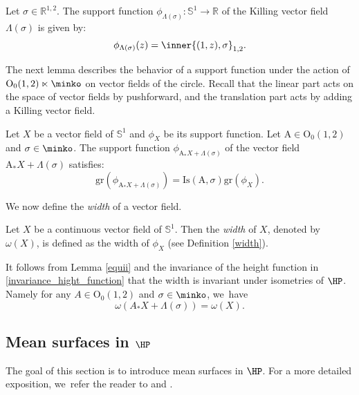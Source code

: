 \begin{cor}\label{support_function_of_killing}
Let $\sigma\in \mathbb{R}^{1,2}$. The support function $\phi_{\Lambda(\sigma)}:\mathbb{S}^1\to \mathbb{R}$ of the Killing vector field $\Lambda(\sigma)$ is given by:
\[
\phi_{\Lambda(\sigma)}(z)=\inner{(1,z),\sigma}_{1,2}.
\]
\end{cor}
The next lemma describes the behavior of a support function under the action of $\mathrm{O}_0(1,2)\ltimes\minko$ on vector fields of the circle. Recall that the linear part acts on the space of vector fields by pushforward, and the translation part acts by adding a Killing vector field.

\begin{lemma}\label{equii}
Let $X$ be a vector field of $\mathbb{S}^1$ and $\phi_X$ be its support function. Let $\mathrm{A}\in\mathrm{O}_0(1,2)$ and $\sigma\in\minko$. The support function $\phi_{\mathrm{A}_*X+\Lambda(\sigma)}$ of the vector field $\mathrm{A}_*X+\Lambda(\sigma)$ satisfies:\begin{equation}
\mathrm{gr}(\phi_{\mathrm{A}_*X+\Lambda(\sigma)})=\mathrm{Is}(\mathrm{A},\sigma)\mathrm{gr}(\phi_X).
\end{equation}

\end{lemma}
We now define the \emph{width} of a vector field.

\begin{defi}\label{widthX}
Let $X$ be a continuous vector field of $\mathbb{S}^1$. Then the \emph{width} of $X$, denoted by $\omega(X)$, is defined as the width of $\phi_X$ (see Definition \ref{width}).
\end{defi}
It follows from Lemma \ref{equii} and the invariance of the height function in \eqref{invariance_hight_function} that the width is invariant under isometries of $\HP$. Namely for any $A\in \mathrm{O}_{0}(1,2)$ and $\sigma\in\minko$, we~have
\[
\omega(A_*X+\Lambda(\sigma))=\omega(X).
\]

\subsection{Mean surfaces in \texorpdfstring{$\HP$}{HP}}
The goal of this section is to introduce mean surfaces in $\HP$. For a more detailed exposition, we~refer the reader to \cite[\S 5.2-6.3]{fillastreseppi} and \cite[\S 2.3.2]{barbotfillastre}.

